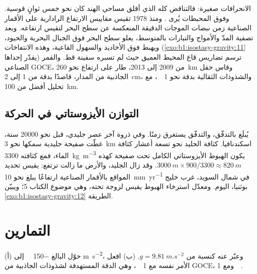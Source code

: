 الانحرافات صغيرة: فالتناقض كله الذي أقلق مساحي الهند كان نحو خمس ثوانٍ قوسية. وفوق المحيطات يُرى .
ومنذ 1978 تقيس مقاييس الارتفاع الرادارية على الأقمار الصناعية زمن نبضات الموجات الدقيقة المنعكسة عن سطح البحر لتقيس ارتفاعه. وبعد تصفية المدّ والأمواج والتيارات بالمتوسط، يعلو سطح البحر فوق الجبال البحرية والحيود، ويهبط فوق الأخاديد والسهول القاعية، وهذه الانتفاخات (\cref{exo:b1:isostasy-gravity:11} يقدّر إحداها) ترسم تضاريس قاع المحيط العميق حيث لم تسبره سفينة قط. والقمر الصناعي GOCE، من 2009 إلى 2013، طار على ارتفاع نحو \qty{260}{km} وقاس حقل الجاذبية من المدار، قاصدًا  بدقة من 1 إلى \qty{2}{cm}، والشذوذات الثقالية بدقة نحو \qty{1}{\milli\gal}، مع تحليل أفضل من \qty{100}{km}.

\subsection*{التوازن الأيزوستاتي في الحركة}

يُبلَغ  بالتدفّق، والتدفّق يستغرق زمنًا. وفي ذروة آخر عصر جليدي، قبل نحو \num{20000} سنة، غطّت صفيحة جليدية سمكها نحو \qty{3}{km} اسكندنافيا.
كثافة الجليد نحو تسعة أعشار كثافة الماء، فمع  كثافته \qty{3300}{kg.m^{-3}} يكون الهبوط الأيزوستاتي الكامل تحت صفيحة كهذه $\qty{3000}{m}\times900/3300 \approx \qty{820}{m}$. وقد زال الجليد، والأرض ما زالت ترتفع: يقيس تحديد المواقع بالأقمار الصناعية ارتفاعًا يبلغ نحو \qty{10}{mm.yr^{-1}} في شمال السويد، غرب خليج بوثنيا، اليوم. ومعدّل استرخاء الهبوط يقيس لزوجة  تحته، وهي موضوع الكتاب 5؛ ويبيّن \cref{exo:b1:isostasy-gravity:12} الطريقة.

\section{التمارين}

\begin{exercise}[$\star$]\label{exo:b1:isostasy-gravity:1}
(أ) حوّل  البالغ \qty{-150}{\milli\gal} إلى \unit{m.s^{-2}}، وعبّر عنه كنسبة من $g = \qty{9.81}{m.s^{-2}}$. (ب) افعل الأمر نفسه مع \qty{1}{\milli\gal}، وهي الدقة المستهدفة لشذوذات الجاذبية من GOCE، ومع \qty{1}{\micro\gal}.
\end{exercise}

